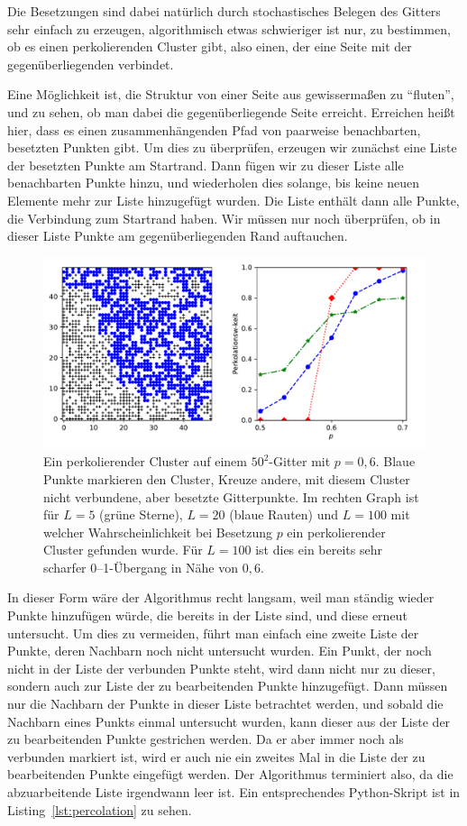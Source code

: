 Die Besetzungen sind dabei natürlich durch stochastisches Belegen des
Gitters sehr einfach zu erzeugen, algorithmisch etwas schwieriger ist
nur, zu bestimmen, ob es einen perkolierenden Cluster gibt, also
einen, der eine Seite mit der gegenüberliegenden verbindet.

Eine Möglichkeit ist, die Struktur von einer Seite aus gewissermaßen
zu "`fluten"', und zu sehen, ob man dabei die gegenüberliegende Seite
erreicht. Erreichen heißt hier, dass es einen zusammenhängenden Pfad
von paarweise benachbarten, besetzten Punkten gibt. Um dies zu
überprüfen, erzeugen wir zunächst eine Liste der besetzten Punkte am
Start\-rand.  Dann fügen wir zu dieser Liste alle benachbarten Punkte
hinzu, und wiederholen dies solange, bis keine neuen Elemente mehr zur
Liste hinzugefügt wurden. Die Liste enthält dann alle Punkte, die
Verbindung zum Startrand haben. Wir müssen nur noch überprüfen, ob in
dieser Liste Punkte am gegenüberliegenden Rand auftauchen.

\begin{figure}
  \centering
  \includegraphics[width=\textwidth]{plots/percolation}
  \caption{Ein perkolierender Cluster auf einem $50^2$-Gitter mit
    $p=0,6$. Blaue Punkte markieren den Cluster, Kreuze andere, mit
    diesem Cluster nicht verbundene, aber besetzte Gitterpunkte. Im
    rechten Graph ist für $L=5$ (grüne Sterne), $L=20$ (blaue
    Rauten) und $L=100$ mit welcher Wahrscheinlichkeit bei
    Besetzung $p$ ein perkolierender Cluster gefunden wurde. Für
    $L=100$ ist dies ein bereits sehr scharfer 0--1-Übergang in Nähe
    von $0,6$.}
  \label{fig:percolation}
\end{figure}

In dieser Form wäre der Algorithmus recht langsam, weil man ständig
wieder Punkte hinzufügen würde, die bereits in der Liste sind, und
diese erneut untersucht. Um dies zu vermeiden, führt man einfach eine
zweite Liste der Punkte, deren Nachbarn noch nicht untersucht
wurden. Ein Punkt, der noch nicht in der Liste der verbunden Punkte
steht, wird dann nicht nur zu dieser, sondern auch zur Liste der zu
bearbeitenden Punkte hinzugefügt. Dann müssen nur die Nachbarn der
Punkte in dieser Liste betrachtet werden, und sobald die Nachbarn
eines Punkts einmal untersucht wurden, kann dieser aus der Liste der
zu bearbeitenden Punkte gestrichen werden. Da er aber immer noch als
verbunden markiert ist, wird er auch nie ein zweites Mal in die Liste
der zu bearbeitenden Punkte eingefügt werden. Der Algorithmus
terminiert also, da die abzuarbeitende Liste irgendwann leer ist. Ein
entsprechendes Python-Skript ist in Listing~\ref{lst:percolation} zu
sehen.

